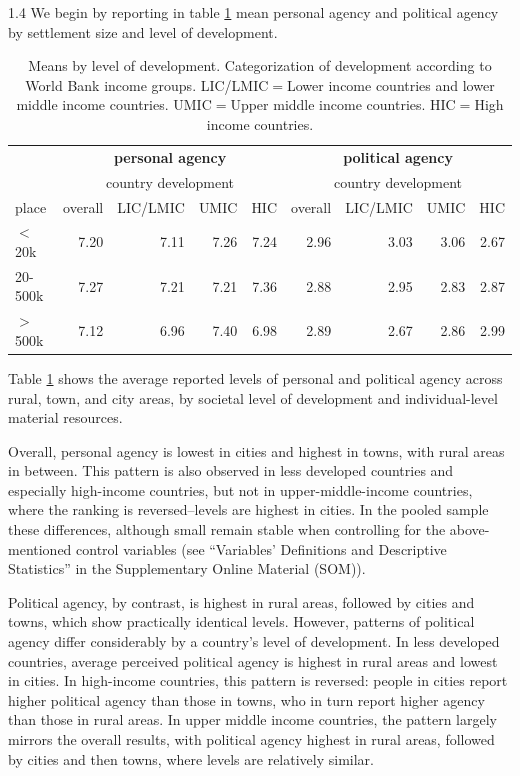 \documentclass[10pt, letterpaper]{article}
\begin{document}
\begin{spacing}{1.4}
We begin by reporting in table \ref{m0} mean personal agency and political agency by settlement size and level of development. 

\begin{table}[H]\centering\footnotesize
\caption{\label{m0} Means by level of development. Categorization of development
  according to World Bank income groups. LIC/LMIC$=$Lower income countries and
  lower middle income countries. UMIC$=$Upper middle income countries. HIC$=$High income countries.}
\begin{tabular} {lrrrr|rrrr}   \hline 
       & \multicolumn{4}{c|}{\bf personal agency}          &\multicolumn{4}{c}{\bf political agency}\\
       & \multicolumn{4}{c}{country development}          &\multicolumn{4}{c}{country development}\\ 
place  &overall&LIC/LMIC&UMIC&HIC&overall&LIC/LMIC&UMIC&HIC\\ \hline
$<$20k &7.20   &7.11            &7.26        &7.24&2.96   &3.03            &3.06        &2.67\\
20-500k&7.27   &7.21            &7.21        &7.36&2.88   &2.95            &2.83        &2.87\\
$>$500k&7.12   &6.96            &7.40        &6.98&2.89   &2.67            &2.86        &2.99\\ \hline
\end{tabular}\end{table}


Table \ref{m0} shows the average reported levels of personal and political agency across rural, town, and city areas, by societal level of development and individual-level material resources.

Overall, personal agency is lowest in cities and highest in
towns, with rural areas in between. This pattern is also observed in less
developed countries and especially high-income countries, but not in
upper-middle-income countries, where the ranking is reversed--levels are highest
in cities. In the pooled sample these differences, although small remain stable 
when controlling for the above-mentioned control variables (see ``Variables'
Definitions and  Descriptive Statistics'' in the Supplementary Online Material (SOM)). 


Political agency, by contrast, is highest in rural areas, followed by cities and towns, which show practically identical levels. However, patterns of political agency differ
considerably by a country's level of development. In  less developed countries,
average perceived political agency is highest in rural areas and lowest in
cities. In high-income countries, this pattern is reversed: people in cities
report higher political agency than those in towns, who in turn report higher
agency than those in rural areas. In upper middle income countries, the pattern largely mirrors
the overall results, with political agency highest in rural areas, followed by
cities and then towns, 
where levels are relatively similar.


\end{spacing}
\end{document}
